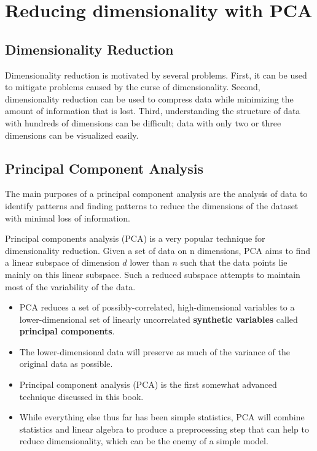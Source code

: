 \documentclass[SKL-MASTER.tex]{subfiles}
\begin{document}
	\Large
\section*{Reducing dimensionality with PCA}

\subsection*{Dimensionality Reduction}
Dimensionality reduction is motivated by
several problems. First, it can be used to mitigate problems caused by the curse of
dimensionality. Second, dimensionality reduction can be used to compress data while
minimizing the amount of information that is lost. Third, understanding the structure
of data with hundreds of dimensions can be difficult; data with only two or three
dimensions can be visualized easily.

\subsection*{Principal Component Analysis}
\begin{framed}
\noindent The main purposes of a principal component analysis are the analysis of data to identify patterns and finding patterns to 
	reduce the dimensions of the dataset with minimal loss of information.
	
\end{framed}
	Principal components analysis (PCA) is a very popular technique for dimensionality reduction.
	Given a set of data on n dimensions, PCA aims to find a linear subspace of dimension
	$d$ lower than $n$ such that the data points lie mainly on this linear subspace. Such a reduced subspace
	attempts to maintain most of the variability of the data.

\begin{framed}	
	\begin{itemize}
\item PCA reduces
a set of possibly-correlated, high-dimensional variables to a lower-dimensional
set of linearly uncorrelated \textbf{synthetic variables} called \textbf{principal components}. \item The
lower-dimensional data will preserve as much of the variance of the original data
as possible.
	\end{itemize}



	\end{framed}
\begin{itemize}
\item Principal component analysis (PCA) is the first
somewhat advanced technique discussed in this book. \item While everything else thus far has been
simple statistics, PCA will combine statistics and linear algebra to produce a preprocessing step
that can help to reduce dimensionality, which can be the enemy of a simple model.
\end{itemize}
\end{document}
